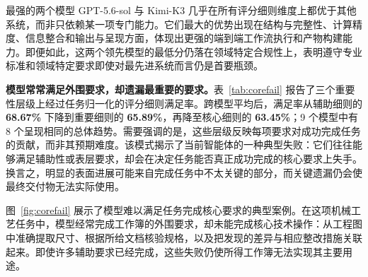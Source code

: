 最强的两个模型 GPT-5.6-sol 与 Kimi-K3 几乎在所有评分细则维度上都优于其他系统，而非只依赖某一项专门能力。它们最大的优势出现在结构与完整性、计算精度、信息整合和输出与呈现方面，体现出更强的端到端工作流执行和产物构建能力。即便如此，这两个领先模型的最低分仍落在领域特定合规性上，表明遵守专业标准和领域特定要求即使对最先进系统而言仍是首要瓶颈。

\textbf{模型常常满足外围要求，却遗漏最重要的要求。}表~\ref{tab:corefail} 报告了三个重要性层级上经过任务归一化的评分细则满足率。跨模型平均后，满足率从辅助细则的 \textbf{68.67\%} 下降到重要细则的 \textbf{65.89\%}，再降至核心细则的 \textbf{63.45\%}；9 个模型中有 8 个呈现相同的总体趋势。需要强调的是，这些层级反映每项要求对成功完成任务的贡献，而非其预期难度。该模式揭示了当前智能体的一种典型失败：它们往往能够满足辅助性或表层要求，却会在决定任务能否真正成功完成的核心要求上失手。换言之，明显的表面进展可能来自完成任务中不太关键的部分，而关键遗漏仍会使最终交付物无法实际使用。

图~\ref{fig:corefail} 展示了模型难以满足任务完成核心要求的典型案例。在这项机械工艺任务中，模型经常完成工作簿的外围要求，却未能完成核心技术操作：从工程图中准确提取尺寸、根据所给文档核验规格，以及把发现的差异与相应整改措施关联起来。即使许多辅助要求已经完成，这些失败仍使所得工作簿无法实现其主要用途。

\begin{table}[t]
\centering
\small
\caption{不同重要性层级上经过任务归一化的评分细则满足率（\%）。对每个模型--任务--试验组合，我们先计算各重要性层级内的满足率，再在任务和试验之间求平均。}
\label{tab:corefail}
\end{table}

